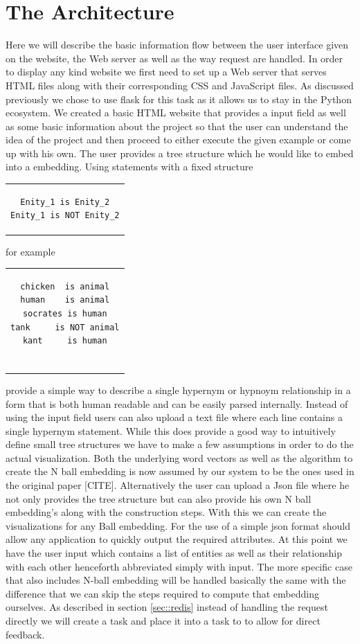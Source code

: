 \documentclass[]{article}
\begin{document}
\section{The Architecture}
\label{sec::arch}
Here we will describe the basic information flow between the user interface given on the website, the Web server as well as the way request are handled. In order to display any kind website we first need to set up a Web server that serves HTML files along with their corresponding CSS and JavaScript files. As discussed previously we chose to use flask for this task as it allows us to stay in the Python ecosystem. We created a basic HTML website that provides a input field as well as some basic information about the project so that the user can understand the idea of the project and then proceed to either execute the given example or come up with his own. 
The user provides a tree structure which he would like to embed into a  embedding. Using statements with a fixed structure
\begin{center}
	
\begin{tabular}{c}
\begin{lstlisting}
Enity_1 is Enity_2
Enity_1 is NOT Enity_2
\end{lstlisting}
\end{tabular}
	
for example
	
\begin{tabular}{c}
\begin{lstlisting}
chicken  is animal
human    is animal
socrates is human
tank     is NOT animal
kant     is human
		
\end{lstlisting}
\end{tabular}
\end{center}
provide a simple way to describe a single hypernym or hypnoym relationship in a form that is both human readable and can be easily parsed internally. Instead of using the input field users can also upload a text file where each line contains a single hypernym statement. While this does provide a good way to intuitively define small tree structures we have to make a few assumptions in order to do the actual visualization. Both the underlying word vectors as well as the algorithm to create the N ball embedding is now assumed by our system to be the ones used in the original paper [CITE]. Alternatively the user can upload a Json file where he not only provides the tree structure but can also provide his own N ball embedding's along with the construction steps. With this we can create the visualizations for any Ball embedding. For the use of a simple json format should allow any application to quickly output the required attributes. 
At this point we have the user input which contains a list of entities as well as their relationship with each other henceforth abbreviated simply with input. The more specific case that also includes N-ball embedding will be handled basically the same with the difference that we can skip the steps required to compute that embedding ourselves. As described in section \ref{sec::redis} instead of handling the request directly we will create a task and place it into a task to to allow for direct feedback.  
\end{document}
